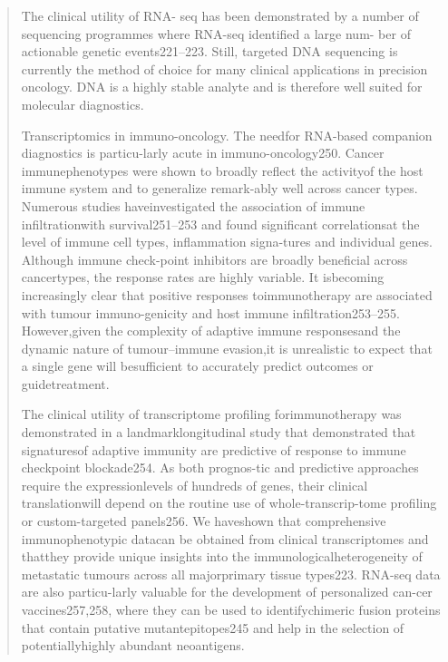 \documentclass[12pt,]{book}
\theoremstyle{definition}
\theoremstyle{definition}
\theoremstyle{definition}
\theoremstyle{remark}
\begin{document}
\begin{quote}
The clinical utility of RNA- seq has been demonstrated by a number of
sequencing programmes where RNA-seq identified a large num- ber of
actionable genetic events221--223. Still, targeted DNA sequencing is
currently the method of choice for many clinical applications in
precision oncology. DNA is a highly stable analyte and is therefore well
suited for molecular diagnostics.

Transcriptomics in immuno-oncology. The needfor RNA-based companion
diagnostics is particu-larly acute in immuno-oncology250. Cancer
immunephenotypes were shown to broadly reflect the activityof the host
immune system and to generalize remark-ably well across cancer types.
Numerous studies haveinvestigated the association of immune
infiltrationwith survival251--253 and found significant correlationsat
the level of immune cell types, inflammation signa-tures and individual
genes. Although immune check-point inhibitors are broadly beneficial
across cancertypes, the response rates are highly variable. It
isbecoming increasingly clear that positive responses toimmunotherapy
are associated with tumour immuno-genicity and host immune
infiltration253--255. However,given the complexity of adaptive immune
responsesand the dynamic nature of tumour--immune evasion,it is
unrealistic to expect that a single gene will besufficient to accurately
predict outcomes or guidetreatment.

The clinical utility of transcriptome profiling forimmunotherapy was
demonstrated in a landmarklongitudinal study that demonstrated that
signaturesof adaptive immunity are predictive of response to immune
checkpoint blockade254. As both prognos-tic and predictive approaches
require the expressionlevels of hundreds of genes, their clinical
translationwill depend on the routine use of whole-transcrip-tome
profiling or custom-targeted panels256. We haveshown that comprehensive
immunophenotypic datacan be obtained from clinical transcriptomes and
thatthey provide unique insights into the immunologicalheterogeneity of
metastatic tumours across all majorprimary tissue types223. RNA-seq data
are also particu-larly valuable for the development of personalized
can-cer vaccines257,258, where they can be used to identifychimeric
fusion proteins that contain putative mutantepitopes245 and help in the
selection of potentiallyhighly abundant neoantigens.


\end{quote}
\end{document}
